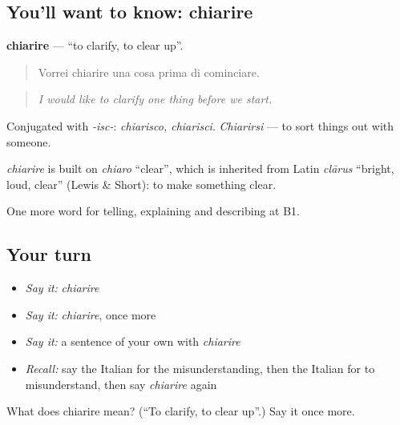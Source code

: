 \subsection*{You'll want to know: chiarire}
\textbf{chiarire} — \textquotedblleft{}to clarify, to clear up\textquotedblright{}.

\begin{quote}
Vorrei chiarire una cosa prima di cominciare.
\end{quote}

\begin{quote}
\emph{I would like to clarify one thing before we start.}
\end{quote}

Conjugated with \emph{-isc-}: \emph{chiarisco, chiarisci}. \emph{Chiarirsi} — to sort things out with someone.

\begin{cousinweb}
\emph{chiarire} is built on \emph{chiaro} \textquotedblleft{}clear\textquotedblright{}, which is inherited from Latin \emph{clārus} \textquotedblleft{}bright, loud, clear\textquotedblright{} (Lewis \& Short): to make something clear.
\end{cousinweb}

\begin{grammarlens}[title={What you've built}]
One more word for telling, explaining and describing at B1.
\end{grammarlens}

\subsection*{Your turn}
\begin{itemize}
\raggedright
  \item \emph{Say it:} \emph{chiarire}
  \item \emph{Say it:} \emph{chiarire}, once more
  \item \emph{Say it:} a sentence of your own with \emph{chiarire}
  \item \emph{Recall:} say the Italian for the misunderstanding, then the Italian for to misunderstand, then say \emph{chiarire} again
\end{itemize}

\begin{tcolorbox}[breakable,colback=teal!4,colframe=teal!35!black,title={Before you move on}]
What does chiarire mean? (\textquotedblleft{}To clarify, to clear up\textquotedblright{}.) Say it once more.
\end{tcolorbox}
